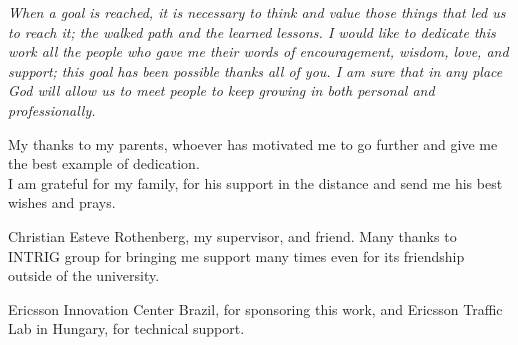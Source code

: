 

\tableofcontents*
\cleardoublepage

\begin{dedicatoria}
    \vspace*{\fill}
    \centering
    \noindent
    \textit{When a goal is reached, it is necessary to think and value those things that led us to reach it; the walked path and the learned lessons.  I would like to dedicate this work all the people who gave me their words of encouragement, wisdom, love, and support; this goal has been possible thanks all of you.  I am sure that in any place God will allow us to meet  people to keep growing in both personal and professionally.} 
    
    \vspace*{\fill}
\end{dedicatoria}

\begin{agradecimentos}
   
My thanks to my parents, whoever has motivated me to go further and give me the best example of dedication. \\
I am grateful for my family, for his support in the distance and send me his best wishes and prays.

Christian Esteve Rothenberg, my supervisor, and friend.
Many thanks to INTRIG group for bringing me support many times even for its friendship outside of the university.

Ericsson Innovation Center Brazil, for sponsoring this work, and Ericsson Traffic Lab in Hungary, for technical support.

    


    
    
\end{agradecimentos}

